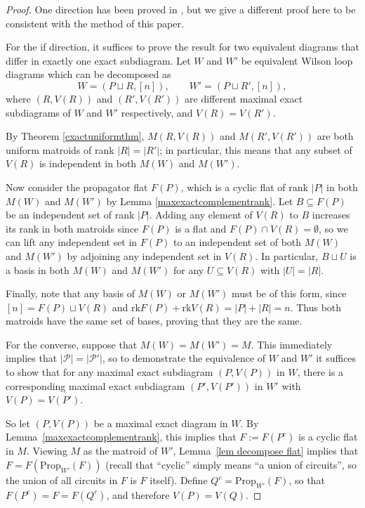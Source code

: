 \documentclass[11pt]{article}
\newcommand{\rk}{\textrm{rk} }
\newcommand{\cP}{\mathcal{P}}
\newcommand{\Prop}{\textrm{Prop}}
\theoremstyle{remark}
\theoremstyle{definition}
\begin{document}
\begin{proof}One direction has been proved in \cite[Theorem 1.18]{wilsonloop}, but we give a different proof here to be consistent with the method of this paper. 

For the if direction, it suffices to prove the result for two equivalent diagrams that differ in exactly one exact subdiagram. Let $W$ and $W'$ be equivalent Wilson loop diagrams which can be decomposed as
\[W = (P \sqcup R, [n]), \qquad W' = (P \sqcup R', [n]),\]
where $(R,V(R))$ and $(R',V(R'))$ are different maximal exact subdiagrams of $W$ and $W'$ respectively, and $V(R) = V(R')$. 

By Theorem \ref{exactuniformthm}, $M(R, V(R))$ and $M(R',V(R'))$ are both uniform matroids of rank $|R| = |R'|$; in particular, this means that any subset of $V(R)$ is independent in both $M(W)$ and $M(W')$.

Now consider the propagator flat $F(P)$, which is a cyclic flat of rank $|P|$ in both $M(W)$ and $M(W')$ by Lemma \ref{maxexactcomplementrank}. Let $B \subseteq F(P)$ be an independent set of rank $|P|$. Adding any element of $V(R)$ to $B$ increases its rank in both matroids since $F(P)$ is a flat and $F(P) \cap V(R) = \emptyset$, so we can lift any independent set in $F(P)$ to an independent set of both $M(W)$ and $M(W')$ by adjoining any independent set in $V(R)$. In particular, $B\sqcup U$ is a basis in both $M(W)$ and $M(W')$ for any $U \subseteq V(R)$ with $|U| = |R|$.

Finally, note that any basis of $M(W)$ or $M(W')$ must be of this form, since $[n] = F(P) \sqcup V(R)$ and $\rk F(P) + \rk V(R) = |P| + |R| = n$. Thus both matroids have the same set of bases, proving that they are the same.

For the converse, suppose that $M(W) = M(W') = M$. This immediately implies that $|\cP| = |\cP'|$, so to demonstrate the equivalence of $W$ and $W'$ it suffices to show that for any maximal exact subdiagram $(P,V(P))$ in $W$, there is a corresponding maximal exact subdiagram $(P',V(P'))$ in $W'$ with $V(P) = V(P')$.

So let $(P,V(P))$ be a maximal exact diagram in $W$. By Lemma~\ref{maxexactcomplementrank}, this implies that $F:=F(P^c)$ is a cyclic flat in $M$. Viewing $M$ as the matroid of $W'$, Lemma~\ref{lem decompose flat} implies that $F = F(\Prop_{W'}(F))$ (recall that ``cyclic'' simply means ``a union of circuits'', so the union of all circuits in $F$ is $F$ itself). Define $Q^c = \Prop_{W'}(F)$, so that $F(P^c) = F = F(Q^c)$, and therefore $V(P) = V(Q)$.


\end{proof}
\end{document}
